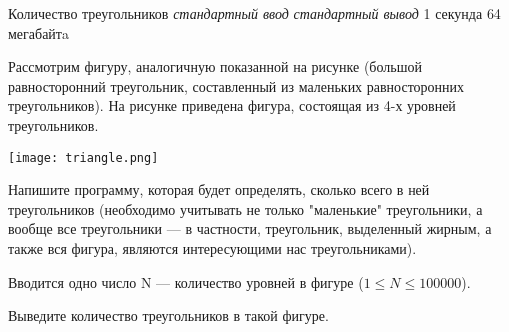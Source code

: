\graphicspath{ {./images/} }
\begin{problem}%
{Количество треугольников}%
{\textsl{стандартный ввод}}%
{\textsl{стандартный вывод}}%
{1 секунда}%
{64 мегабайтa}{}

Рассмотрим фигуру, аналогичную показанной на рисунке (большой равносторонний треугольник, составленный из маленьких равносторонних треугольников). На рисунке приведена фигура, состоящая из 4-х уровней треугольников.

\begin{center}
\texttt{[image: triangle.png]}
\end{center}

Напишите программу, которая будет определять, сколько всего в ней треугольников (необходимо учитывать не только "маленькие" треугольники, а вообще все треугольники — в частности, треугольник, выделенный жирным, а также вся фигура, являются интересующими нас треугольниками).

\InputFile

Вводится одно число N — количество уровней в фигуре ($1 \le N \le 100000$).  

\OutputFile

Выведите  количество треугольников в такой фигуре.

\Examples

\begin{example}
%
%
%
\end{example}
\end{problem}
